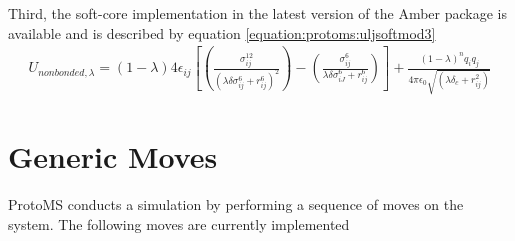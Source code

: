 \documentclass[letterpaper,10pt,english]{sphinxmanual}
\begin{document}
Third, the soft-core implementation in the latest version of the Amber package is available and is described by equation \eqref{equation:protoms:uljsoftmod3}
\begin{equation}\label{equation:protoms:uljsoftmod3}
\begin{split}U_{non bonded,\lambda}= (1-\lambda) 4{\epsilon}_{ij} \left[ \left( \frac{ \sigma_{ij}^{12} }{ ( \lambda \delta \sigma_{ij}^6 + r_{ij}^{6} )^{2}} \right) - \left( \frac{ \sigma_{ij}^{6} }{ \lambda \delta \sigma_{iJ}^6 + r_{ij}^{6} } \right) \right] +  \frac{(1-\lambda)^{n} q_{i}q_{j}} {4\pi{\epsilon}_{0} \sqrt{( \lambda \delta_c +  r_{ij}^{2})}}\end{split}
\end{equation}

\section{Generic Moves}
\label{\detokenize{protoms:generic-moves}}\label{\detokenize{protoms:moves}}
ProtoMS conducts a simulation by performing a sequence of moves on the system. The following moves are currently implemented
\end{document}
